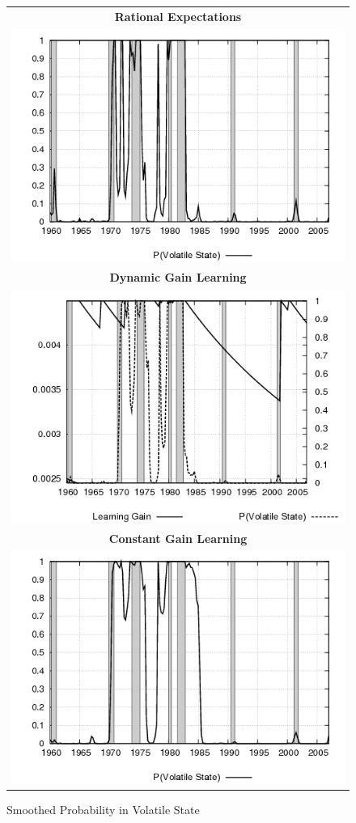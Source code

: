 \begin{figure}[ht]
\caption{Smoothed Probability in Volatile State}\label{fg3:pvol}
\begin{center}
\begin{tabular}{c}
\textbf{Rational Expectations} \\  
\includegraphics[scale=0.5]{results_re/states_sm.png} \\
\textbf{Dynamic Gain Learning} \\
\includegraphics[scale=0.5]{results_dg8_wlsinit/states_sm.png} \\
\textbf{Constant Gain Learning} \\
\includegraphics[scale=0.5]{results_cg_wlsinit/states_sm.png} 

\end{tabular}
\end{center}
\end{figure}
